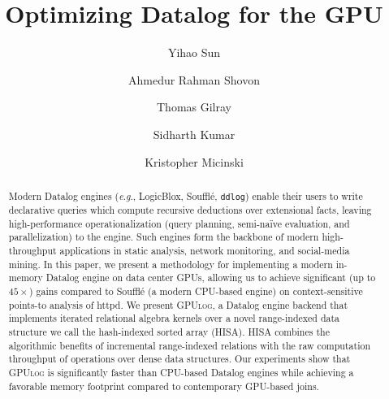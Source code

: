 \documentclass[nonacm,sigplan]{acmart}
\newcommand{\tool}{\textsc{GPUlog}}
\begin{document}
\title{Optimizing Datalog for the GPU}

\author{Yihao Sun}

\author{Ahmedur Rahman Shovon}

\author{Thomas Gilray}

\author{Sidharth Kumar}

\author{Kristopher Micinski}

\begin{abstract}
 Modern Datalog engines (\emph{e}.\emph{g}., LogicBlox, Souffl\'e, \texttt{ddlog}) enable their users to write declarative queries which compute recursive deductions over extensional facts, leaving high-performance operationalization (query planning, semi-na\"ive evaluation, and parallelization) to the engine. Such engines form the backbone of modern high-throughput applications in static analysis, network monitoring, and social-media mining.
 In this paper, we present a methodology for implementing a modern in-memory Datalog engine on data center GPUs, allowing us to achieve significant (up to $45\times$) gains compared to Souffl\'e (a modern CPU-based engine) on context-sensitive points-to analysis of \textsf{httpd}.
 We present \tool{}, a Datalog engine backend that implements iterated relational algebra kernels over a novel range-indexed data structure we call the hash-indexed sorted array (HISA). HISA combines the algorithmic benefits of incremental range-indexed relations with the raw computation throughput of operations over dense data structures. Our experiments show that \tool{} is significantly faster than CPU-based Datalog engines while achieving a favorable memory footprint compared to contemporary GPU-based joins.
\end{abstract}

\maketitle %
\pagestyle{plain} %
\end{document}
